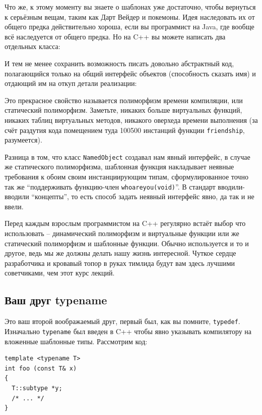 \documentclass[a4paper,12pt,oneside]{article}
\begin{document}
Что же, к этому моменту вы знаете о шаблонах уже достаточно, чтобы вернуться к серьёзным вещам, таким как Дарт Вейдер и покемоны. Идея наследовать их от общего предка действительно хороша, если вы программист на Java, где вообще всё наследуется от общего предка. Но на C++ вы можете написать два отдельных класса:



И тем не менее сохранить возможность писать довольно абстрактный код, полагающийся только на общий интерфейс объектов (способность сказать имя) и отдающий им на откуп детали реализации:



Это прекрасное свойство называется полиморфизм времени компиляции, или статический полиморфизм. Заметьте, никаких больше виртуальных функций, никаких таблиц виртуальных методов, никакого оверхеда времени выполнения (за счёт раздутия кода помещением туда 100500 инстанций функции \lstinline!friendship!, разумеется).

Разница в том, что класс \lstinline!NamedObject! создавал нам явный интерфейс, в случае же статического полиморфизма, шаблонная функция накладывает неявные требования к обоим своим инстанциирующим типам, сформулированное точно так же ``поддерживать функцию-член \lstinline!whoareyou(void)!''. В стандарт вводили-вводили ``концепты'', то есть способ задать неявный интерфейс явно, да так и не ввели. 

Перед каждым взрослым программистом на C++ регулярно встаёт выбор что использовать – динамический полиморфизм и виртуальные функции или же статический полиморфизм и шаблонные функции. Обычно используется и то и другое, ведь мы же должны делать нашу жизнь интересной. Чуткое сердце разработчика и кровавый топор в руках тимлида будут вам здесь лучшими советчиками, чем этот курс лекций.

\subsection{Ваш друг typename}

Это ваш второй воображаемый друг, первый был, как вы помните, \lstinline!typedef!. Изначально \lstinline!typename! был введен в C++ чтобы явно указывать компилятору на вложенные шаблонные типы. Рассмотрим код:

\begin{lstlisting}
template <typename T>
int foo (const T& x)
{
  T::subtype *y;
  /* ... */
}
\end{lstlisting}
\end{document}
